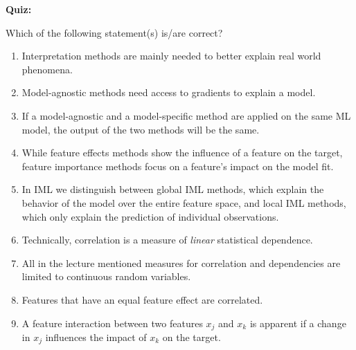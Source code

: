 \textbf{Quiz:}\\ \noindent
\vspace{0.1cm}

Which of the following statement(s) is/are correct?  
        	\begin{enumerate}
        	\item Interpretation methods are mainly needed to better explain real world phenomena. 
        	\item Model-agnostic methods need access to gradients to explain a model. 
        	\item If a model-agnostic and a model-specific method are applied on the same ML model, the output of the two methods will be the same.
        	\item While feature effects methods show the influence of a feature on the target, feature importance methods focus on a feature's impact on the model fit.
        	\item In IML we distinguish between global IML methods, which explain the behavior of the model over the entire feature space, and local IML methods, which only explain the prediction of individual observations. 
        	\item Technically, correlation is a measure of \textit{linear} statistical dependence. 
        	\item All in the lecture mentioned measures for correlation and dependencies are limited to continuous random variables.
        	\item Features that have an equal feature effect are correlated. 
        	\item A feature interaction between two features $x_j$ and $x_k$ is apparent if a change in $x_j$ influences the impact of $x_k$ on the target.
        \end{enumerate}
